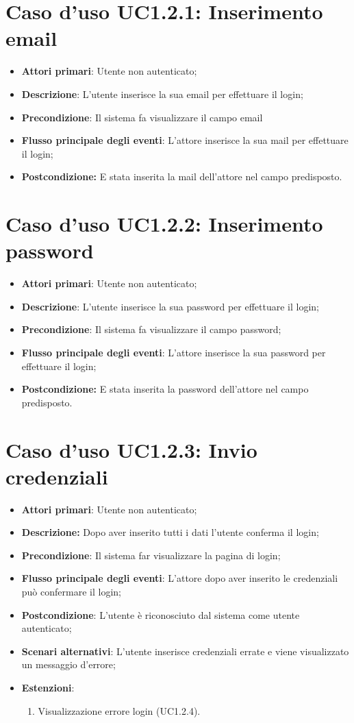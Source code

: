 			
\section{Caso d'uso UC1.2.1:  Inserimento email}
\begin{itemize}
	\item \textbf{Attori primari}: Utente non autenticato;
	\item \textbf{Descrizione}: L'utente inserisce la sua email per effettuare il login;
	\item \textbf{Precondizione}: Il sistema fa visualizzare il campo email
	\item \textbf{Flusso principale degli eventi}: L'attore inserisce la sua mail per effettuare il login;
	\item \textbf{Postcondizione:} E stata inserita la mail dell'attore nel campo predisposto. 
\end{itemize}

\section{Caso d'uso UC1.2.2:  Inserimento password}
	\begin{itemize}
		\item \textbf{Attori primari}: Utente non autenticato;
		\item \textbf{Descrizione}: L'utente inserisce la sua password per effettuare il login;
		\item \textbf{Precondizione}: Il sistema fa visualizzare il campo password;
		\item \textbf{Flusso principale degli eventi}: L'attore inserisce la sua password per effettuare il login;
		\item \textbf{Postcondizione:} E stata inserita la password dell'attore nel campo predisposto. 
	\end{itemize}
	\section{Caso d'uso UC1.2.3:  Invio credenziali}
	\begin{itemize}
		\item \textbf{Attori primari}: Utente non autenticato;
		\item \textbf{Descrizione:} Dopo aver inserito tutti i dati l'utente conferma il login;
		\item \textbf{Precondizione}: Il sistema far visualizzare la pagina di login;
		\item \textbf{Flusso principale degli eventi}: L'attore dopo aver inserito le credenziali può confermare il login;
		\item \textbf{Postcondizione}: L'utente è riconosciuto dal sistema come utente autenticato;
		\item \textbf{Scenari alternativi}: L'utente inserisce credenziali errate e viene visualizzato un messaggio d'errore;
		\item \textbf{Estenzioni}:
		\begin{enumerate}
			\item Visualizzazione errore login (UC1.2.4).
		\end{enumerate} 
	\end{itemize}
